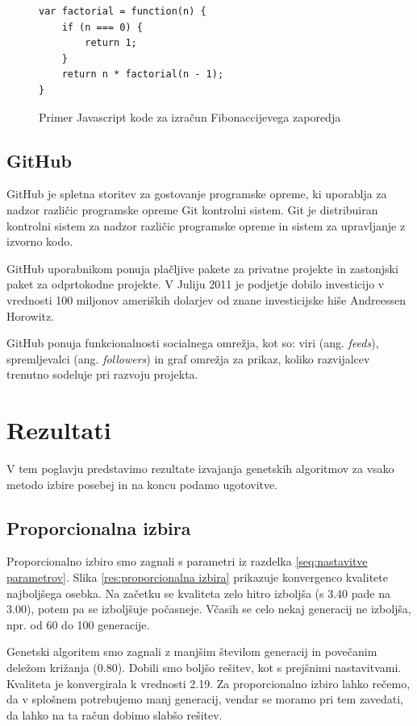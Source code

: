 \documentclass[a4paper, 12pt]{book}
\begin{document}
\begin{figure}
\begin{lstlisting}
var factorial = function(n) {
    if (n === 0) {
        return 1;
    }
    return n * factorial(n - 1);
}
\end{lstlisting}
\caption{Primer Javascript kode za izra\v cun Fibonaccijevega zaporedja}
\label{fig:javascript primer}
\end{figure}

\section{GitHub}
\label{seq:github}
GitHub je spletna storitev za gostovanje programske opreme, ki uporablja za nadzor razli\v cic programske opreme Git kontrolni sistem. Git je distribuiran kontrolni sistem za nadzor razli\v cic programske opreme in sistem za upravljanje z izvorno kodo.

GitHub uporabnikom ponuja pla\v cljive pakete za privatne projekte in zastonjski paket za odprtokodne projekte. V Juliju 2011 je podjetje dobilo investicijo v vrednosti 100 miljonov ameri\v skih dolarjev od znane investicijske hi\v se Andreessen Horowitz.

GitHub ponuja funkcionalnosti socialnega omre\v zja, kot so: viri (ang. \textit{feeds}), spremljevalci (ang. \textit{followers}) in graf omre\v zja za prikaz, koliko razvijalcev trenutno sodeluje pri razvoju projekta.
\cite{wikipedia-github}

\chapter{Rezultati}
\label{ch4}

V tem poglavju predstavimo rezultate izvajanja genetskih algoritmov za vsako metodo izbire posebej in na koncu podamo ugotovitve.

\section{Proporcionalna izbira}
Proporcionalno izbiro smo zagnali s parametri iz razdelka \ref{seq:nastavitve parametrov}. Slika \ref{res:proporcionalna izbira} prikazuje konvergenco kvalitete najbolj\v sega osebka. Na za\v cetku se kvaliteta zelo hitro izbolj\v sa (s 3.40 pade na 3.00), potem pa se izbolj\v suje po\v casneje. V\v casih se celo nekaj generacij ne izbolj\v sa, npr. od 60 do 100 generacije. 

Genetski algoritem smo zagnali z manj\v sim \v stevilom generacij in pove\v canim dele\v zom kri\v zanja (0.80). Dobili smo bolj\v so re\v sitev, kot s prej\v snimi nastavitvami. Kvaliteta je konvergirala k vrednosti 2.19. Za proporcionalno izbiro lahko re\v cemo, da v splo\v snem potrebujemo manj generacij, vendar se moramo pri tem zavedati, da lahko na ta ra\v cun dobimo slab\v so re\v sitev.
\end{document}
